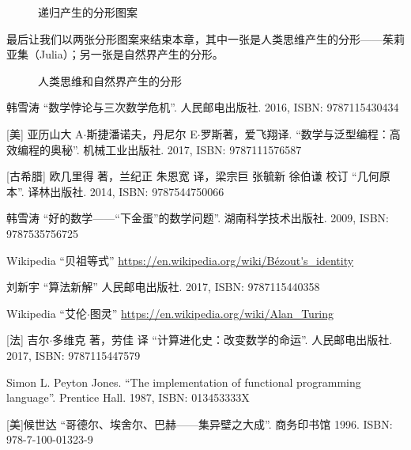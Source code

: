 \documentclass{article}
\begin{document}
\begin{figure}[htbp]
 \centering
 \caption{递归产生的分形图案}
 \label{fig:fractal}
\end{figure}

最后让我们以两张分形图案来结束本章，其中一张是人类思维产生的分形——茱莉亚集（Julia）；另一张是自然界产生的分形。

\begin{figure}[htbp]
 \centering
 \caption{人类思维和自然界产生的分形}
 \label{fig:more-fractal}
\end{figure}

\ifx\wholebook\relax \else
\begin{thebibliography}{99}

韩雪涛 ``数学悖论与三次数学危机''. 人民邮电出版社. 2016, ISBN: 9787115430434

[美] 亚历山大 A$\cdot$斯捷潘诺夫，丹尼尔 E$\cdot$罗斯著，爱飞翔译. ``数学与泛型编程：高效编程的奥秘''. 机械工业出版社. 2017, ISBN: 9787111576587

[古希腊] 欧几里得 著，兰纪正 朱恩宽 译，梁宗巨 张毓新 徐伯谦 校订 ``几何原本''. 译林出版社. 2014, ISBN: 9787544750066

韩雪涛 ``好的数学——“下金蛋”的数学问题''. 湖南科学技术出版社. 2009, ISBN: 9787535756725

Wikipedia ``贝祖等式'' \url{https://en.wikipedia.org/wiki/Bézout's_identity}

刘新宇 ``算法新解'' 人民邮电出版社. 2017, ISBN: 9787115440358

Wikipedia ``艾伦$\cdot$图灵'' \url{https://en.wikipedia.org/wiki/Alan_Turing}

[法] 吉尔$\cdot$多维克 著，劳佳 译 ``计算进化史：改变数学的命运''. 人民邮电出版社. 2017, ISBN: 9787115447579

Simon L. Peyton Jones. ``The implementation of functional programming language''. Prentice Hall. 1987, ISBN: 013453333X

[美]候世达 ``哥德尔、埃舍尔、巴赫——集异壁之大成''. 商务印书馆 1996. ISBN: 978-7-100-01323-9

\end{thebibliography}

\expandafter\enddocument

\fi
\end{document}
